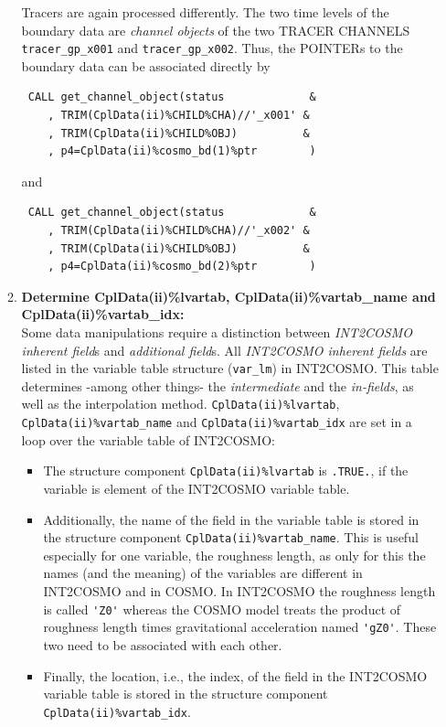 \documentclass[11pt,twoside]{article}
\begin{document}
\begin{itemize}
\begin{enumerate}
Tracers are again processed differently. The two time levels of the boundary 
data are {\it channel objects} of the two TRACER CHANNELS \verb|tracer_gp_x001|
and \verb|tracer_gp_x002|. Thus, the { \footnotesize POINTERs} to the boundary 
data can be associated directly by
\begin{verbatim}
 CALL get_channel_object(status             & 
    , TRIM(CplData(ii)%CHILD%CHA)//'_x001' &
    , TRIM(CplData(ii)%CHILD%OBJ)          &
    , p4=CplData(ii)%cosmo_bd(1)%ptr        )
\end{verbatim}

and 
 
\begin{verbatim}
 CALL get_channel_object(status             & 
    , TRIM(CplData(ii)%CHILD%CHA)//'_x002' &
    , TRIM(CplData(ii)%CHILD%OBJ)          &
    , p4=CplData(ii)%cosmo_bd(2)%ptr        )
\end{verbatim}


\item {\bf Determine CplData(ii)\%lvartab, CplData(ii)\%vartab\_name and
  CplData(ii)\%vartab\_idx:}\\%
  Some data manipulations require a distinction between
  {\it INT2COSMO inherent field}s and {\it additional field}s. All {\it INT2COSMO inherent fields} are listed in the variable table structure (\verb|var_lm|)
  in INT2COSMO. This table determines -among
  other things- the {\it intermediate} and the {\it in-fields}, as well as the 
  interpolation method. \verb|CplData(ii)%lvartab|, 
  \verb|CplData(ii)%vartab_name| and \verb|CplData(ii)%vartab_idx| are set in a 
  loop over the variable table of INT2COSMO:
  \begin{itemize}%
  \item The structure component \verb|CplData(ii)%lvartab| is \verb|.TRUE.|, if 
  the variable is element of the INT2COSMO variable table.
  \item Additionally, the name of the field in the variable table is stored in 
  the structure component \verb|CplData(ii)%vartab_name|. This is useful 
  especially for one
  variable, the roughness length, as only for this the names (and the meaning)
  of the variables are different in INT2COSMO and in COSMO. In INT2COSMO
  the roughness length is called \verb|'Z0'| whereas the COSMO model treats the
  product of roughness length times gravitational acceleration named 
  \verb|'gZ0'|. These two need to be associated with each other.
  \item Finally, the location, i.e., the index, of the field in the INT2COSMO 
  variable table is stored in the structure component 
  \verb|CplData(ii)%vartab_idx|.
  \end{itemize}%


\end{enumerate}
\end{itemize}
\end{document}

